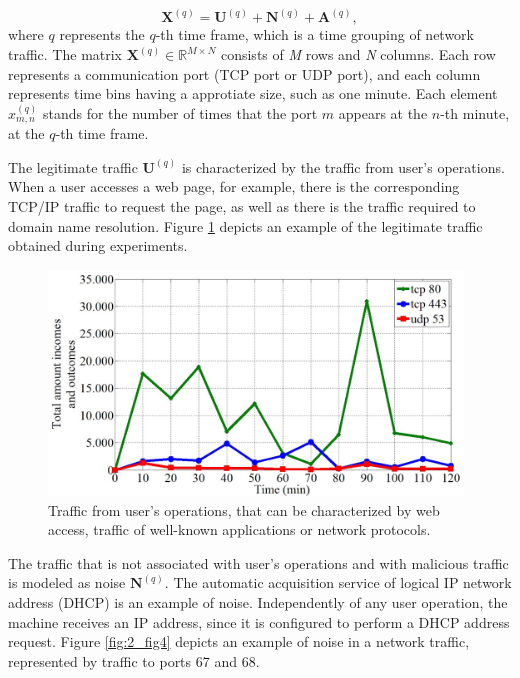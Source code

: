 \begin{equation}\label{eq:eq01}
\boldsymbol{X}^{(q)} = \boldsymbol{U}^{(q)} + \boldsymbol{N}^{(q)} + \boldsymbol{A}^{(q)},
\end{equation}
where $q$ represents the $q$-th time frame, which is a time grouping of network traffic. The matrix $\boldsymbol{X}^{(q)} \in \mathbb{R}^{M \times N}$ consists of \emph{M} rows and \emph{N} columns. Each row represents a communication port (TCP port or UDP port), and each column represents time bins having a approtiate size, such as one minute. Each element $x_{m,n}^{(q)}$ stands for the number of times that the port $m$ appears at the $n$-th minute, at the $q$-th time frame.

The legitimate traffic $\boldsymbol{U}^{(q)}$ is characterized by the traffic from user's operations. When a user accesses a web page, for example, there is the corresponding TCP/IP traffic to request the page, as well as there is the traffic required to domain name resolution. Figure \ref{fig:2_fig3} depicts an example of the legitimate traffic obtained during experiments.

\begin{figure}[h!]
     \centering 
     \includegraphics[width=11cm]{figures/fig03.png}
     \caption{Traffic from user's operations, that can be characterized by web access, traffic of well-known applications or network protocols.}
     \label{fig:2_fig3}
\end{figure}

The traffic that is not associated with user's operations and with malicious traffic is modeled as noise $\boldsymbol{N}^{(q)}$. The automatic acquisition service of logical IP network address (DHCP) is an example of noise. Independently of any user operation, the machine receives an IP address, since it is configured to perform a DHCP address request. Figure \ref{fig:2_fig4} depicts an example of noise in a network traffic, represented by traffic to ports 67 and 68.

